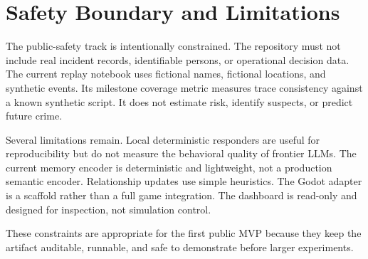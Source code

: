 \section{Safety Boundary and Limitations}

The public-safety track is intentionally constrained. The repository must not include real incident records, identifiable persons, or operational decision data. The current replay notebook uses fictional names, fictional locations, and synthetic events. Its milestone coverage metric measures trace consistency against a known synthetic script. It does not estimate risk, identify suspects, or predict future crime.

Several limitations remain. Local deterministic responders are useful for reproducibility but do not measure the behavioral quality of frontier LLMs. The current memory encoder is deterministic and lightweight, not a production semantic encoder. Relationship updates use simple heuristics. The Godot adapter is a scaffold rather than a full game integration. The dashboard is read-only and designed for inspection, not simulation control.

These constraints are appropriate for the first public MVP because they keep the artifact auditable, runnable, and safe to demonstrate before larger experiments.
